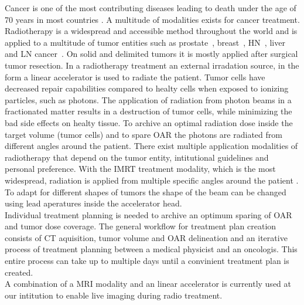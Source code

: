 Cancer is one of the most contributing diseases leading to death under the age of 70 years in most countries \cite{bray_everincreasing_2021}. 
A multitude of modalities exists for cancer treatment. 
Radiotherapy is a widespread and accessible method throughout the world \cite{shahzad_overview_2018} and is applied to a multitude of tumor entities such as prostate~\cite{geinitz_3d_2005, nguyen_curative_2005, budiharto_external_nodate}, breast~\cite{ragaz_adjuvant_1997, lena_combined_nodate, taylor_estimating_2017}, \ac{HN}~\cite{datta_head_1990, bhide_advances_2010, castadot_adaptive_2010, morgan_adaptive_2020}, liver~\cite{hoyer_radiotherapy_2012, wulf_stereotactic_2001, wulf_stereotactic_2006, sterzing_stereotactic_2014, witt_mri-guided_2020} and \ac{LN} cancer~\cite{degro_degro_2014, matsushita_stereotactic_2018, mikell_postoperative_2015, lundstedt_long-term_2012, jereczek-fossa_is_2015}.
On solid and delimited tumors it is mostly applied after surgical tumor resection.
In a radiotherapy treatment an external irradation source, in the form a linear accelerator is used to radiate the patient.
Tumor cells have decreased repair capabilities compared to healty cells when exposed to ionizing particles, such as photons. 
The application of radiation from photon beams in a fractionated matter results in a destruction of tumor cells, while minimizing the bad side effects on healty tissue.
To archive an optimal radiation dose inside the target volume (tumor cells) and to spare \ac{OAR} the photons are radiated from different angles around the patient. 
There exist multiple application modalities of radiotherapy that depend on the tumor entity, intitutional guidelines and personal preference.
With the \ac{IMRT} treatment modality, which is the most widespread, radiation is applied from multiple specific angles around the patient \cite{cho_intensity-modulated_2018}.
To adapt for different shapes of tumors the shape of the beam can be changed using lead aperatures inside the accelerator head.\\
Individual treatment planning is needed to archive an optimum sparing of \acs{OAR} and tumor dose coverage.
The general workflow for treatment plan creation consists of \ac{CT} aquisition, tumor volume and \ac{OAR} delineation and an iterative process of treatment planning between a medical physicist and an oncologis. 
This entire process can take up to multiple days until a convinient treatment plan is created.\\
A combination of a \ac{MRI} modality and an linear accelerator is currently used at our intitution to enable live imaging during radio treatment. 
